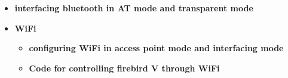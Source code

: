 \documentclass[table,10pt,blue]{beamer}	%
\begin{document}
{\begin{frame}
\begin{itemize}
\begin{itemize}
			\item \textbf{interfacing bluetooth in AT mode and transparent mode}\color{black}
		\end{itemize}
	\end{itemize}
	\begin{itemize}
		\item \color{red} \textbf{WiFi}  \color{black}
		\begin{itemize} \color{blue}
			\item \textbf{configuring WiFi in access point mode and interfacing mode}
			\item \textbf{Code for controlling firebird V through WiFi} \color{black}
		\end{itemize}
	\end{itemize}
\end{frame}
}

\end{document}
